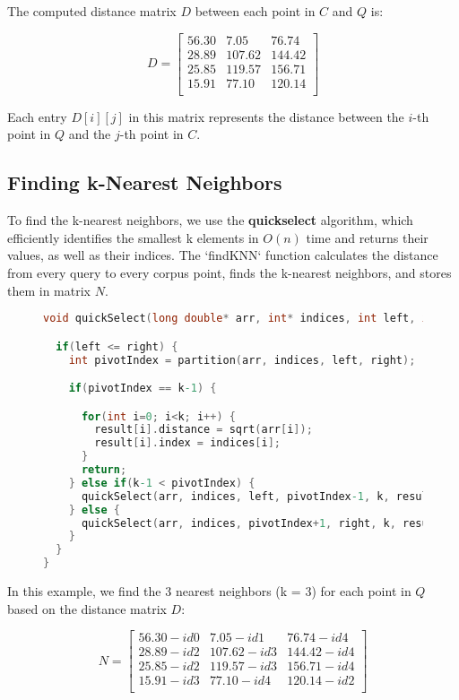 \documentclass{article}
\begin{document}
The computed distance matrix \( D \) between each point in \( C \) and \( Q \) is:

\[
D = \begin{bmatrix}
56.30 & 7.05 & 76.74 \\
28.89 & 107.62 & 144.42 \\
25.85 & 119.57 & 156.71 \\
15.91 & 77.10 & 120.14 \\
\end{bmatrix}
\]

Each entry \( D[i][j] \) in this matrix represents the distance between the \( i \)-th point in \( Q \) and the \( j \)-th point in \( C \).

\subsection{Finding k-Nearest Neighbors}
To find the k-nearest neighbors, we use the \textbf{quickselect} algorithm, which efficiently identifies the smallest k elements in \( O(n) \) time and returns their values, as well as their indices. The `findKNN` function calculates the distance from every query to every corpus point, finds the k-nearest neighbors, and stores them in matrix \( N \).

\begin{figure}[H]
\begin{lstlisting}[language=C, caption={Quick Select algorithm implementation}]
void quickSelect(long double* arr, int* indices, int left, int right, int k, Neighbor* result) {

  if(left <= right) {
    int pivotIndex = partition(arr, indices, left, right);

    if(pivotIndex == k-1) {

      for(int i=0; i<k; i++) {
        result[i].distance = sqrt(arr[i]);
        result[i].index = indices[i];
      }
      return;
    } else if(k-1 < pivotIndex) {
      quickSelect(arr, indices, left, pivotIndex-1, k, result);
    } else {
      quickSelect(arr, indices, pivotIndex+1, right, k, result);
    }
  }
}
\end{lstlisting}
\end{figure}

In this example, we find the 3 nearest neighbors (k = 3) for each point in \( Q \) based on the distance matrix \( D \):

\[
N = \begin{bmatrix}
56.30 - id0 & 7.05 - id1 & 76.74 - id4 \\
28.89 - id2 & 107.62 - id3 & 144.42 - id4 \\
25.85 - id2 & 119.57 - id3 & 156.71 - id4 \\
15.91 - id3 & 77.10 - id4 & 120.14 - id2 \\
\end{bmatrix}
\]
\end{document}
